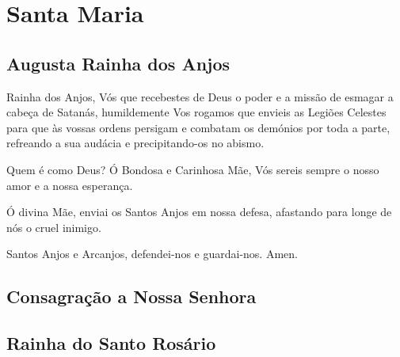 
\section{Santa Maria}

\subsection{Augusta Rainha dos Anjos}

 Rainha dos Anjos, Vós que recebestes de Deus o poder e a missão de esmagar a cabeça de Satanás, humildemente Vos rogamos que envieis as Legiões Celestes para que às vossas ordens persigam e combatam os demónios por toda a parte, refreando a sua audácia e precipitando-os no abismo.\par
Quem é como Deus? Ó Bondosa e Carinhosa Mãe, Vós sereis sempre o nosso amor e a nossa esperança.\par
Ó divina Mãe, enviai os Santos Anjos em nossa defesa, afastando para longe de nós o cruel inimigo.\par
Santos Anjos e Arcanjos, defendei-nos e guardai-nos. Amen.\par

\subsection{Consagração a Nossa Senhora}

\begin{paracol}{2}\switchcolumn{}\switchcolumn*{}\switchcolumn{}\switchcolumn*{}\switchcolumn{}\end{paracol}

\subsection{Rainha do Santo Rosário}

